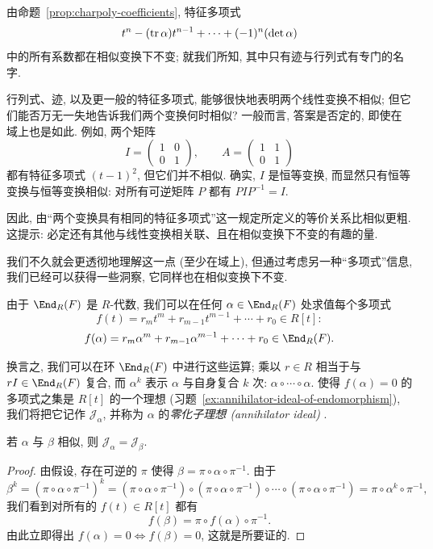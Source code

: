 由命题~\ref{prop:charpoly-coefficients}, 特征多项式
\[
t^n-(\operatorname{tr}\alpha)t^{n-1}+\cdots+(-1)^n(\det\alpha)
\]
中的所有系数都在相似变换下不变; 就我们所知, 其中只有迹与行列式有专门的名字.

行列式、迹, 以及更一般的特征多项式, 能够很快地表明两个线性变换不相似; 但它们能否万无一失地告诉我们两个变换何时相似? 一般而言, 答案是否定的, 即使在域上也是如此. 例如, 两个矩阵
\[
I=\begin{pmatrix}1&0\\0&1\end{pmatrix},\qquad
A=\begin{pmatrix}1&1\\0&1\end{pmatrix}
\]
都有特征多项式 $(t-1)^2$, 但它们并不相似. 确实, $I$ 是恒等变换, 而显然只有恒等变换与恒等变换相似: 对所有可逆矩阵 $P$ 都有 $PIP^{-1}=I$.

因此, 由``两个变换具有相同的特征多项式''这一规定所定义的等价关系比相似更粗. 这提示: 必定还有其他与线性变换相关联、且在相似变换下不变的有趣的量.

我们不久就会更透彻地理解这一点 (至少在域上), 但通过考虑另一种``多项式''信息, 我们已经可以获得一些洞察, 它同样也在相似变换下不变.

由于 $\End_R(F)$ 是 $R$-代数, 我们可以在任何 $\alpha\in\End_R(F)$ 处求值每个多项式
\[
f(t)=r_mt^m+r_{m-1}t^{m-1}+\cdots+r_0\in R[t]:
\]
\[
f(\alpha)=r_m\alpha^m+r_{m-1}\alpha^{m-1}+\cdots+r_0\in\End_R(F).
\]

换言之, 我们可以在环 $\End_R(F)$ 中进行这些运算; 乘以 $r\in R$ 相当于与 $rI\in\End_R(F)$ 复合, 而 $\alpha^k$ 表示 $\alpha$ 与自身复合 $k$ 次: $\alpha\circ\cdots\circ\alpha$. 使得 $f(\alpha)=0$ 的多项式之集是 $R[t]$ 的一个理想 (习题~\ref{ex:annihilator-ideal-of-endomorphism}), 我们将把它记作 $\mathcal{J}_\alpha$, 并称为 $\alpha$ 的\emph{零化子理想 (annihilator ideal)}
.

\begin{lemma}\label{lem:similar-annihilator}
若 $\alpha$ 与 $\beta$ 相似, 则 $\mathcal{J}_\alpha=\mathcal{J}_\beta$.
\end{lemma}

\begin{proof}
由假设, 存在可逆的 $\pi$ 使得 $\beta=\pi\circ\alpha\circ\pi^{-1}$. 由于
\[
\beta^k=(\pi\circ\alpha\circ\pi^{-1})^k=(\pi\circ\alpha\circ\pi^{-1})\circ(\pi\circ\alpha\circ\pi^{-1})\circ\cdots\circ(\pi\circ\alpha\circ\pi^{-1})=\pi\circ\alpha^k\circ\pi^{-1},
\]
我们看到对所有的 $f(t)\in R[t]$ 都有
\[
f(\beta)=\pi\circ f(\alpha)\circ\pi^{-1}.
\]
由此立即得出 $f(\alpha)=0\iff f(\beta)=0$, 这就是所要证的.
\end{proof}

